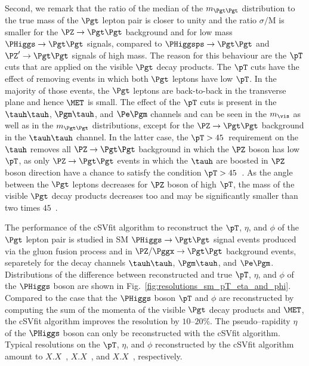 Second, we remark that the ratio of the median of the $m_{\Pgt\Pgt}$ distribution to the true mass of the $\Pgt$ lepton pair 
is closer to unity and the ratio $\sigma/\textrm{M}$ is smaller
for the $\PZ \to \Pgt\Pgt$ background and for low mass $\PHiggs \to
\Pgt\Pgt$ signals, compared to $\PHiggsps \to \Pgt\Pgt$ and $\PZ' \to \Pgt\Pgt$ signals of high mass.
The reason for this behaviour are the $\pT$ cuts that are applied on the visible $\Pgt$ decay products.
The $\pT$ cuts have the effect of removing events in which both $\Pgt$ leptons have low $\pT$.
In the majority of those events,
the $\Pgt$ leptons are back-to-back in the transverse plane and hence $\MET$ is small.
The effect of the $\pT$ cuts is present in the $\tauh\tauh$, $\Pgm\tauh$, and $\Pe\Pgm$ channels and can be seen in the $m_{\vis}$ as well as in the $m_{\Pgt\Pgt}$ distributions,
except for the $\PZ \to \Pgt\Pgt$ background in the $\tauh\tauh$ channel.
In the latter case,
the $\pT > 45$~\GeV requirement on the $\tauh$ removes all $\PZ \to \Pgt\Pgt$ background in which the $\PZ$ boson has low $\pT$,
as only $\PZ \to \Pgt\Pgt$ events in which the $\tauh$ are boosted in
$\PZ$ boson direction have a chance to satisfy the condition $\pT >
45$~\GeV.
As the angle between the $\Pgt$ leptons decreases for $\PZ$ boson of
high $\pT$,
the mass of the visible $\Pgt$ decay products decreases too and may be
significantly smaller than two times $45$~\GeV.

The performance of the cSVfit algorithm to reconstruct the $\pT$,
$\eta$, and $\phi$ of the $\Pgt$ lepton pair is studied in SM $\PHiggs
\to \Pgt\Pgt$ signal events produced via the gluon fusion process
and in $\PZ/\Pggx \to \Pgt\Pgt$ background events,
separetely for the decay channels $\tauh\tauh$, $\Pgm\tauh$, and $\Pe\Pgm$.
Distributions of the difference between reconstructed and true $\pT$,
$\eta$, and $\phi$ of the $\PHiggs$ boson are shown in
Fig.~\ref{fig:resolutions_sm_pT_eta_and_phi}.
Compared to the case that the $\PHiggs$ boson $\pT$ and $\phi$ are
reconstructed by computing the sum of the momenta of the visible $\Pgt$
decay products and $\MET$, the cSVfit algorithm improves the
resolution by $10$--$20\%$. The pseudo--rapidity $\eta$ of the
$\PHiggs$ boson can only be reconstructed with the cSVfit algorithm.
Typical resolutions on the $\pT$, $\eta$,
and $\phi$ reconstructed by the cSVfit algorithm amount to $X.X$~\GeV, $X.X$~\mrad, and $X.X$~\mrad,
respectively.

